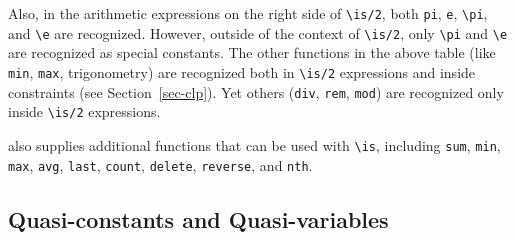 \documentclass[11pt]{article}
\newcommand{\ERGO}{\mbox{\smaller{\ensuremath{\cal{E}}\smaller{{\sc{RGO}}}}}\xspace}
\newcommand{\bs}{\textbackslash}
\begin{document}
Also, in the arithmetic expressions on the right side of
\texttt{\bs{}is/2},
both \texttt{pi}, \texttt{e},
\texttt{\bs{}pi}, and \texttt{\bs{}e} are recognized. However, outside of
the context of \texttt{\bs{}is/2}, only \texttt{\bs{}pi} and
\texttt{\bs{}e} are recognized as special constants. The other functions in
the above table (like \texttt{min}, \texttt{max}, trigonometry) are
recognized both in \texttt{\bs{}is/2} expressions and inside constraints
(see Section~\ref{sec-clp}). Yet others (\texttt{div}, \texttt{rem},
\texttt{mod}) are recognized only inside \texttt{\bs{}is/2} expressions.   

\ERGO also supplies additional functions that can be used with \texttt{\bs{}is}, including
\texttt{sum}, \texttt{min}, \texttt{max}, \texttt{avg}, \texttt{last},
\texttt{count}, \texttt{delete}, \texttt{reverse},  
and \texttt{nth}.




\subsection{Quasi-constants and Quasi-variables}\label{sec-quasi-constants}
\end{document}
